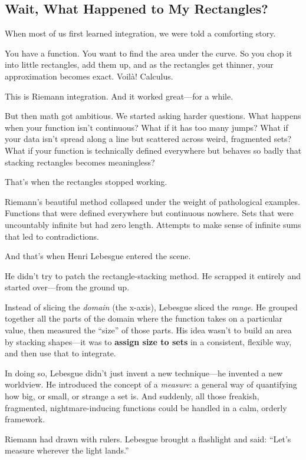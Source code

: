 \subsection{Wait, What Happened to My Rectangles?}

When most of us first learned integration, we were told a comforting story.

You have a function. You want to find the area under the curve. So you chop it into little rectangles, add them up, and as the rectangles get thinner, your approximation becomes exact. Voilà! Calculus.

This is Riemann integration. And it worked great—for a while.

But then math got ambitious. We started asking harder questions. What happens when your function isn’t continuous? What if it has too many jumps? What if your data isn’t spread along a line but scattered across weird, fragmented sets? What if your function is technically defined everywhere but behaves so badly that stacking rectangles becomes meaningless?

That’s when the rectangles stopped working.

Riemann’s beautiful method collapsed under the weight of pathological examples. Functions that were defined everywhere but continuous nowhere. Sets that were uncountably infinite but had zero length. Attempts to make sense of infinite sums that led to contradictions.

And that’s when Henri Lebesgue entered the scene.

He didn’t try to patch the rectangle-stacking method. He scrapped it entirely and started over—from the ground up.

Instead of slicing the \textit{domain} (the x-axis), Lebesgue sliced the \textit{range}. He grouped together all the parts of the domain where the function takes on a particular value, then measured the “size” of those parts. His idea wasn’t to build an area by stacking shapes—it was to \textbf{assign size to sets} in a consistent, flexible way, and then use that to integrate.

In doing so, Lebesgue didn’t just invent a new technique—he invented a new worldview. He introduced the concept of a \textit{measure}: a general way of quantifying how big, or small, or strange a set is. And suddenly, all those freakish, fragmented, nightmare-inducing functions could be handled in a calm, orderly framework.

Riemann had drawn with rulers. Lebesgue brought a flashlight and said: “Let’s measure wherever the light lands.”

